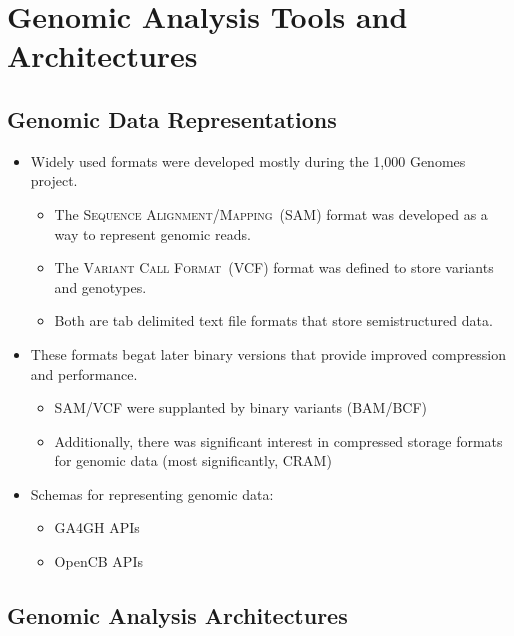 \documentclass[phd]{ucbthesis}
\begin{document}
\section{Genomic Analysis Tools and Architectures}
\label{sec:genomic-analysis}

\subsection{Genomic Data Representations}
\label{sec:genomic-data-representations}

\begin{itemize}
\item Widely used formats were developed mostly during the 1,000 Genomes
  project.
  \begin{itemize}
  \item The \textsc{Sequence Alignment/Mapping}~(SAM) format was developed as
    a way to represent genomic reads.
  \item The \textsc{Variant Call Format}~(VCF) format was defined to store
    variants and genotypes.
  \item Both are tab delimited text file formats that store semistructured data.
  \end{itemize}
\item These formats begat later binary versions that provide improved
  compression and performance.
  \begin{itemize}
  \item SAM/VCF were supplanted by binary variants (BAM/BCF)
  \item Additionally, there was significant interest in compressed storage
    formats for genomic data (most significantly, CRAM)
  \end{itemize}
\item Schemas for representing genomic data:
  \begin{itemize}
  \item GA4GH APIs
  \item OpenCB APIs
  \end{itemize}
\end{itemize}

\subsection{Genomic Analysis Architectures}
\label{sec:genomic-architectures}
\end{document}
